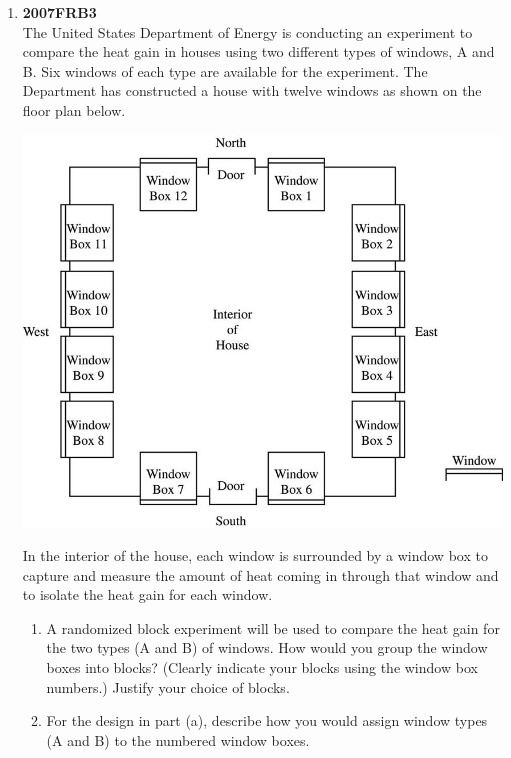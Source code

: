 \documentclass[a4paper,12pt,twoside]{book}
\begin{document}
\begin{enumerate}
   \item \textbf{2007FRB3}\\
    The United States Department of Energy is conducting an experiment to compare the heat gain in houses using two different types of windows, A and B. Six windows of each type are available for the experiment. The Department has constructed a house with twelve windows as shown on the floor plan below.
    \begin{center}
        \includegraphics[scale=0.5]{2007FRB3.JPG}
    \end{center}
    In the interior of the house, each window is surrounded by a window box to capture and measure the amount of heat coming in through that window and to isolate the heat gain for each window.
       \begin{enumerate}[label =(\alph*)]
          \item A randomized block experiment will be used to compare the heat gain for the two types (A and B) of windows. How would you group the window boxes into blocks? (Clearly indicate your blocks using the window box numbers.) Justify your choice of blocks.
          \item For the design in part (a), describe how you would assign window types (A and B) to the numbered window boxes.
       \end{enumerate}
\end{enumerate}
\end{document}
